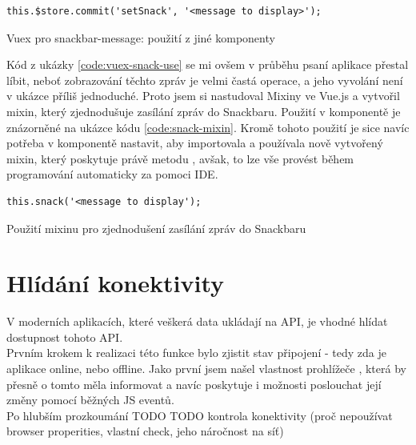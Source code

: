 \begin{listing}[h]
\begin{verbatim}
this.$store.commit('setSnack', '<message to display>');
\end{verbatim}
\caption{Vuex pro snackbar-message: použití z jiné komponenty} \label{code:vuex-snack-use}
\end{listing}

Kód z ukázky \ref{code:vuex-snack-use} se mi ovšem v průběhu psaní aplikace přestal líbit, neboť zobrazování těchto zpráv je velmi častá operace, a jeho vyvolání není v ukázce příliš jednoduché. Proto jsem si nastudoval Mixiny ve Vue.js \cite{vue-mixins} a vytvořil mixin, který zjednodušuje zasílání zpráv do Snackbaru. Použití v komponentě je znázorněné na ukázce kódu \ref{code:snack-mixin}. Kromě tohoto použití je sice navíc potřeba v komponentě nastavit, aby importovala a používala nově vytvořený mixin, který poskytuje právě metodu , avšak, to lze vše provést během programování automaticky za pomoci IDE.

\begin{listing}[h]
\begin{verbatim}
this.snack('<message to display');
\end{verbatim}
\caption{Použití mixinu pro zjednodušení zasílání zpráv do Snackbaru} \label{code:snack-mixin}
\end{listing}


\section{Hlídání konektivity}

V moderních aplikacích, které veškerá data ukládají na API, je vhodné hlídat dostupnost tohoto API.\\
Prvním krokem k realizaci této funkce bylo zjistit stav připojení - tedy zda je aplikace online, nebo offline. Jako první jsem našel vlastnost prohlížeče  \cite{online}, která by přesně o tomto měla informovat a navíc poskytuje i možnosti poslouchat její změny pomocí běžných JS eventů.\\
Po hlubším prozkoumání TODO
TODO kontrola konektivity (proč nepoužívat browser properities, vlastní check, jeho náročnost na síť)


